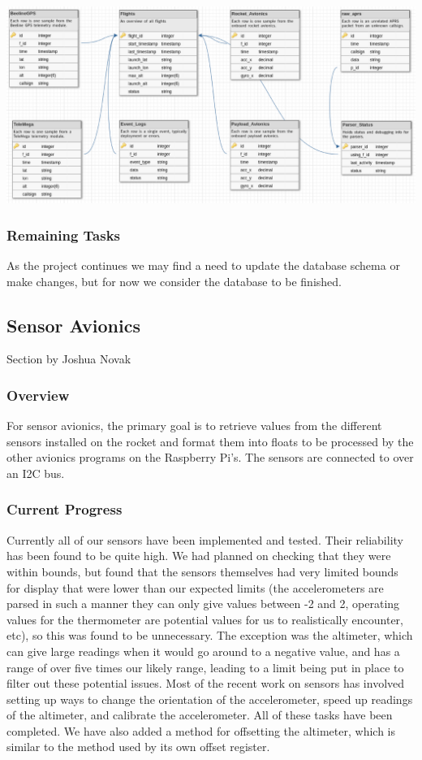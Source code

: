 \documentclass[onecolumn, draftclsnofoot, 10pt, compsoc]{IEEEtran}
\begin{document}
\begin{center}
	\includegraphics[width=.8\textwidth]{images/database_schema_v102.eps}
    \label{database-schema}
\end{center}

\subsubsection{Remaining Tasks}
As the project continues we may find a need to update the database schema or make changes, but for now we consider the database to be finished.

\subsection{Sensor Avionics}
Section by Joshua Novak
\subsubsection{Overview}
For sensor avionics, the primary goal is to retrieve values from the different sensors installed on the rocket and format them into floats to be processed by the other avionics programs on the Raspberry Pi's. The sensors are connected to over an I2C bus.

\subsubsection{Current Progress}
Currently all of our sensors have been implemented and tested. Their reliability has been found to be quite high. We had planned on checking that they were within bounds, but found that the sensors themselves had very limited bounds for display that were lower than our expected limits (the accelerometers are parsed in such a manner they can only give values between -2 and 2, operating values for the thermometer are potential values for us to realistically encounter, etc), so this was found to be unnecessary. The exception was the altimeter, which can give large readings when it would go around to a negative value, and has a range of over five times our likely range, leading to a limit being put in place to filter out these potential issues. Most of the recent work on sensors has involved setting up ways to change the orientation of the accelerometer, speed up readings of the altimeter, and calibrate the accelerometer. All of these tasks have been completed. We have also added a method for offsetting the altimeter, which is similar to the method used by its own offset register.
\end{document}

